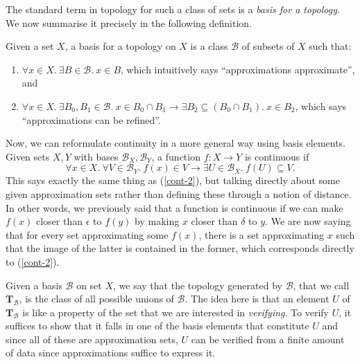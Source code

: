 The standard term in topology for such a class of sets is a \emph{basis for a topology}.
We now summarise it precisely in the following definition.
\begin{defn}
  Given a set $X$, a basis for a topology on $X$ is a class $\mathcal{B}$ of subsets of
  $X$ such that:
  \begin{enumerate}
    \item $\forall x \in X.~ \exists B \in \mathcal{B}.~x \in B$, which intuitively says ``approximations
      approximate'', and
    \item $\forall x \in X.~ \exists B_0, B_1 \in \mathcal{B}.~ x \in B_0 \cap B_1 \rightarrow \exists B_2 \subseteq (B_0 \cap B_1).~
      x \in B_2$, which says ``approximations can be refined''.
  \end{enumerate}
\end{defn}

Now, we can reformulate continuity in a more general way using basis elements. Given sets
$X, Y$ with bases $\mathcal{B}_X, \mathcal{B}_Y$, a function $f : X \rightarrow Y$ is continuous if
\begin{equation}\label{cont-basis}
  \forall x \in X.~ \forall V \in \mathcal{B}_Y.~ f(x) \in V \rightarrow \exists U \in \mathcal{B}_X.~
    f(U) \subseteq V.
\end{equation}
This says exactly the same thing as (\ref{cont-2}), but talking directly about some given
approximation sets rather than defining these through a notion of distance. In other
words, we previously said that a function is continuous if we can make $f(x)$ closer than
$\epsilon$ to $f(y)$ by making $x$ closer than $\delta$ to $y$. We are now saying that for every
set approximating some $f(x)$, there is a set approximating $x$ such that the image of
the latter is contained in the former, which corresponds directly to (\ref{cont-2}).

Given a basis $\mathcal{B}$ on set $X$, we say that the topology generated by
$\mathcal{B}$, that we call $\mathbf{T}_{\mathcal{B}}$, is the class of all possible
unions of $\mathcal{B}$. The idea here is that an element $U$ of
$\mathbf{T}_{\mathcal{B}}$ is like a property of the set that we are interested in
\emph{verifying}. To verify $U$, it suffices to show that it falls in one of the basis
elements that constitute $U$ and since all of these are approximation sets, $U$ can be
verified from a finite amount of data since approximations suffice to express it.

